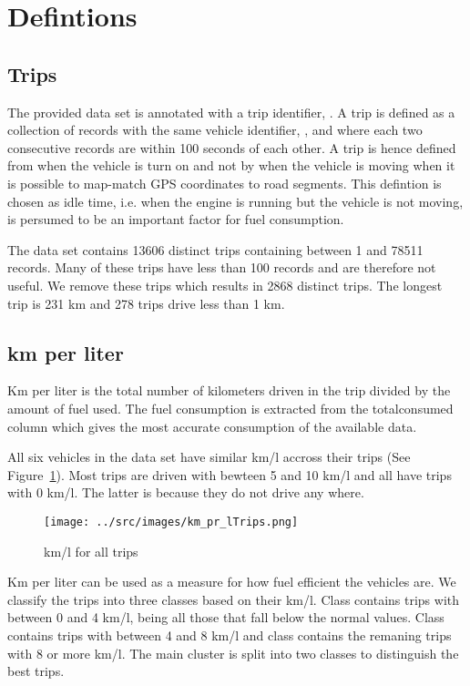 \section{Defintions}
\subsection{Trips}
The provided data set is annotated with a trip identifier, \tid.
A trip is defined as a collection of records with the same vehicle identifier, \vid, and where each two consecutive records are within 100 seconds of each other.
A trip is hence defined from when the vehicle is turn on and not by when the vehicle is moving when it is possible to map-match GPS coordinates to road segments. 
This defintion is chosen as idle time, i.e. when the engine is running but the vehicle is not moving, is persumed to be an important factor for fuel consumption. 


The data set contains 13606 distinct trips containing between 1 and 78511 records.
Many of these trips have less than 100 records and are therefore not useful. %
We remove these trips which results in 2868 distinct trips. 
The longest trip is 231 km and 278 trips drive less than 1 km.

\subsection{km per liter}
Km per liter is the total number of kilometers driven in the trip divided by the amount of fuel used.
The fuel consumption is extracted from the totalconsumed column which gives the most accurate consumption of the available data.

All six vehicles in the data set have similar km/l accross their trips (See Figure~\ref{fig:kmlTrips}).
Most trips are driven with bewteen 5 and 10 km/l and all have trips with 0 km/l. The latter is because they do not drive any where.
\begin{figure}[htb]
\centering
\texttt{[image: ../src/images/km\_pr\_lTrips.png]}
\caption{km/l for all trips}
\label{fig:kmlTrips}
\end{figure}

Km per liter can be used as a measure for how fuel efficient the vehicles are.
We classify the trips into three classes based on their km/l.
Class \fuelLow contains trips with between 0 and 4 km/l, being all those that fall below the normal values.
Class \fuelMedium contains trips with between 4 and 8 km/l and class \fuelHigh contains the remaning trips with 8 or more km/l.
The main cluster is split into two classes to distinguish the best trips.